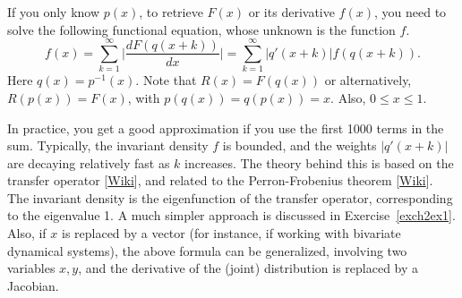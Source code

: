 \documentclass[oneside,10pt]{book}
\begin{document}
If you only know $p(x)$, to retrieve $F(x)$ or its derivative $f(x)$, you need to solve the following functional equation, whose unknown is the function $f$. 
\begin{equation}
f(x)=\sum_{k=1}^\infty \Bigg| \frac{dF(q(x+k))}{dx} \Bigg| = \sum_{k=1}^\infty |q'(x+k)| f(q(x+k)).\label{ch2eq2}
\end{equation}
Here $q(x)=p^{-1}(x)$. Note that $R(x) = F(q(x))$ or alternatively, $R(p(x)) = F(x)$, with $p(q(x)) = q(p(x)) = x$. Also, $0\leq x\leq 1$. 

In practice, you get a good approximation if you use the first 1000 terms in the sum. Typically, the invariant density $f$ is bounded, and the weights $|q'(x+k)|$ are decaying relatively fast as $k$ increases. 
The theory behind this is based on the 
\textcolor{index}{transfer operator} [\href{https://en.wikipedia.org/wiki/Transfer_operator}{Wiki}], and related to
the \textcolor{index}{Perron-Frobenius theorem} [\href{https://en.wikipedia.org/wiki/Perron\%E2\%80\%93Frobenius_theorem}{Wiki}].
The invariant density is the eigenfunction of the transfer operator, corresponding to the eigenvalue 1. A much simpler approach is discussed in Exercise~\ref{exch2ex1}. Also, if $x$ is replaced by a vector (for instance, if working with bivariate dynamical systems), the above formula can be generalized, involving two variables $x, y$, and the derivative of the (joint) distribution is replaced by a Jacobian. 
\end{document}
